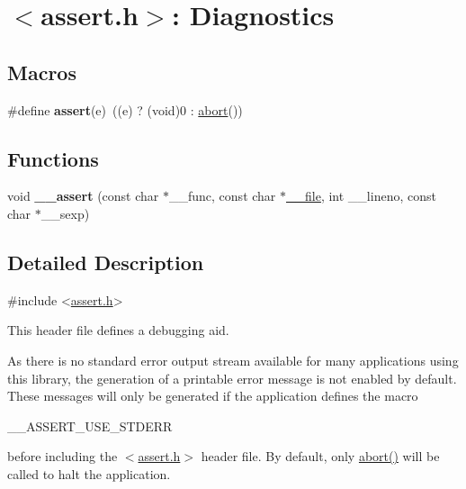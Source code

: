 \hypertarget{group__avr__assert}{}\section{$<$assert.\+h$>$\+: Diagnostics}
\label{group__avr__assert}
\subsection*{Macros}
\begin{DoxyCompactItemize}
\item 
\#define {\bfseries assert}(e)~((e) ? (void)0 \+: \hyperlink{group__avr__stdlib_ga63e28bec3592384b44606f011634c5a8}{abort}())\hypertarget{group__avr__assert_gad6d5aaa966ca7424f7cb9bd01f2c838b}{}\label{group__avr__assert_gad6d5aaa966ca7424f7cb9bd01f2c838b}

\end{DoxyCompactItemize}
\subsection*{Functions}
\begin{DoxyCompactItemize}
\item 
void {\bfseries \+\_\+\+\_\+assert} (const char $\ast$\+\_\+\+\_\+func, const char $\ast$\hyperlink{struct____file}{\+\_\+\+\_\+file}, int \+\_\+\+\_\+lineno, const char $\ast$\+\_\+\+\_\+sexp)\hypertarget{group__avr__assert_ga1f7427826c2188a9ddeb16df2d25737b}{}\label{group__avr__assert_ga1f7427826c2188a9ddeb16df2d25737b}

\end{DoxyCompactItemize}


\subsection{Detailed Description}

\begin{DoxyCode}
\textcolor{preprocessor}{#include <\hyperlink{assert_8h}{assert.h}>} 
\end{DoxyCode}


This header file defines a debugging aid.

As there is no standard error output stream available for many applications using this library, the generation of a printable error message is not enabled by default. These messages will only be generated if the application defines the macro


\begin{DoxyCode}
\_\_ASSERT\_USE\_STDERR 
\end{DoxyCode}


before including the {\ttfamily $<$\hyperlink{assert_8h}{assert.\+h}$>$} header file. By default, only \hyperlink{group__avr__stdlib_ga63e28bec3592384b44606f011634c5a8}{abort()} will be called to halt the application. 
